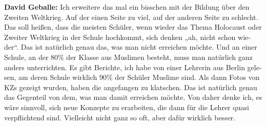 \begin{otherlanguage}{ngerman}
\textbf{David Geballe:} Ich erweitere das mal ein bisschen mit der Bildung über den Zweiten Weltkrieg. Auf der einen Seite zu viel, auf der anderen Seite zu schlecht. Das soll heißen, dass die meisten Schüler, wenn wieder das Thema Holocaust oder Zweiter Weltkrieg in der Schule hochkommt, sich denken „ah, nicht schon wieder“. Das ist natürlich genau das, was man nicht erreichen möchte. Und an einer Schule, an der 80\% der Klasse aus Muslimen besteht, muss man natürlich ganz anders unterrichten. Es gibt Berichte, ich habe von einer Lehrerin aus Berlin gelesen, am deren Schule wirklich 90\% der Schüler Muslime sind. Als dann Fotos von KZs gezeigt wurden, haben die angefangen zu klatschen. Das ist natürlich genau das Gegenteil von dem, was man damit erreichen möchte. Von daher denke ich, es wäre sinnvoll, sich neue Konzepte zu erarbeiten, die dann für die Lehrer quasi verpflichtend sind. Vielleicht nicht ganz so oft, aber dafür wirklich besser. 





\end{otherlanguage}

